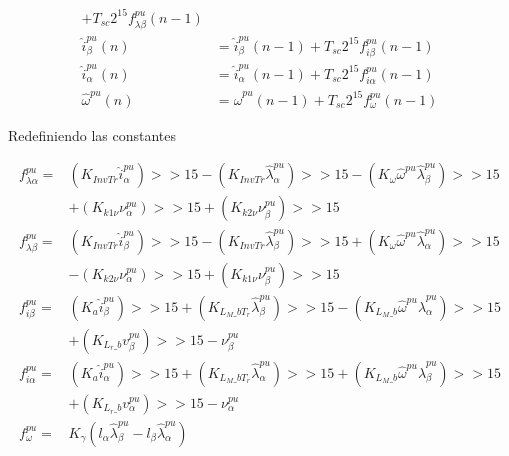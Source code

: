 \documentclass{article}
\begin{document}
\begin{equation}
\begin{aligned}
                        + T_{sc} 2^{15} f_{\lambda\beta}^{pu}(n-1) \\
                    \hat{i}_\beta^{pu}(n) &= \hat{i}_\beta^{pu}(n-1)
                        + T_{sc} 2^{15} f_{i\beta}^{pu}(n-1) \\
                    \hat{i}_\alpha^{pu}(n) &= \hat{i}_\alpha^{pu}(n-1) 
                        + T_{sc} 2^{15} f_{i\alpha}^{pu}(n-1) \\
                    \hat{\omega}^{pu}(n) &= \hat{\omega}^{pu}(n-1)
                        + T_{sc} 2^{15} f_{\omega}^{pu}(n-1)  
                \end{aligned}
            \end{equation}

    
        Redefiniendo las constantes

        \begin{equation}
            \begin{aligned}
                f_{\lambda\alpha}^{pu} =& \left( K_{InvTr}   \hat{i}_\alpha^{pu} \right)>>15 
                    -  \left(K_{InvTr} \hat{\lambda}_\alpha^{pu}  \right)>>15 
                    - \left( K_{\omega} \hat{\omega}^{pu} \hat{\lambda}_\beta^{pu} \right)>>15 \\
                   & +  \left( K_{k1\nu} \nu_\alpha^{pu} \right)>>15 
                    +  \left( K_{k2\nu}\nu_\beta^{pu} \right) >>15\\
                f_{\lambda\beta}^{pu} =& \left(  K_{InvTr} \hat{i}_\beta^{pu} \right) >>15 
                    -  \left( K_{InvTr} \hat{\lambda}_\beta^{pu}  \right) >>15 
                    + \left( K_{\omega} \hat{\omega}^{pu} \hat{\lambda}_\alpha^{pu} \right) >>15 \\
                   & - \left( K_{k2\nu} \nu_\alpha^{pu} \right) >>15 
                    + \left( K_{k1\nu} \nu_\beta^{pu} \right) >>15 \\
                f_{i\beta}^{pu} = &  
                    \left(K_a \hat{i}_\beta^{pu}\right)  >>15   
                    + \left( K_{L_M\_bT_r}  \hat{\lambda}_\beta^{pu}  \right)  >>15 
                     - \left( K_{L_M\_b}  \hat{\omega}^{pu}  \hat{\lambda}_\alpha^{pu}\right)  >>15 \\
                    & + \left( K_{L_r\_b}  v_\beta^{pu} \right) >>15 
                     -    \nu_\beta^{pu}   \\
                f_{i\alpha}^{pu} = & \left( K_a \hat{i}_\alpha^{pu}        \right) >>15  
                   + \left( K_{L_M\_bT_r} \hat{\lambda}_\alpha^{pu}  \right)  >>15
                   + \left(  K_{L_M\_b} \hat{\omega}^{pu} \hat{\lambda}_\beta^{pu}   \right)>>15  \\
                   & + \left( K_{L_r\_b} v_\alpha^{pu} \right) >>15 
                   -  \nu_\alpha^{pu}  \\
                f_\omega^{pu} = & K_\gamma 
                    \left( 
                        l_\alpha \hat{\lambda}_\beta^{pu} 
                        - l_\beta \hat{\lambda}_\alpha^{pu}  
                    \right) 
            \end{aligned}
        \end{equation}
        
\end{document}
